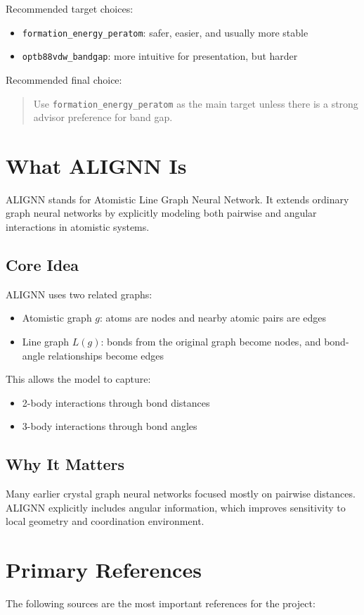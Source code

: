 \documentclass[12pt]{article}
\begin{document}
Recommended target choices:
\begin{itemize}
    \item \texttt{formation\_energy\_peratom}: safer, easier, and usually more stable
    \item \texttt{optb88vdw\_bandgap}: more intuitive for presentation, but harder
\end{itemize}

Recommended final choice:
\begin{quote}
Use \texttt{formation\_energy\_peratom} as the main target unless there is a strong advisor preference for band gap.
\end{quote}

\section{What ALIGNN Is}
ALIGNN stands for Atomistic Line Graph Neural Network. It extends ordinary graph neural networks by explicitly modeling both pairwise and angular interactions in atomistic systems.

\subsection{Core Idea}
ALIGNN uses two related graphs:
\begin{itemize}
    \item Atomistic graph \(g\): atoms are nodes and nearby atomic pairs are edges
    \item Line graph \(L(g)\): bonds from the original graph become nodes, and bond-angle relationships become edges
\end{itemize}

This allows the model to capture:
\begin{itemize}
    \item 2-body interactions through bond distances
    \item 3-body interactions through bond angles
\end{itemize}

\subsection{Why It Matters}
Many earlier crystal graph neural networks focused mostly on pairwise distances. ALIGNN explicitly includes angular information, which improves sensitivity to local geometry and coordination environment.

\section{Primary References}
The following sources are the most important references for the project:
\end{document}
